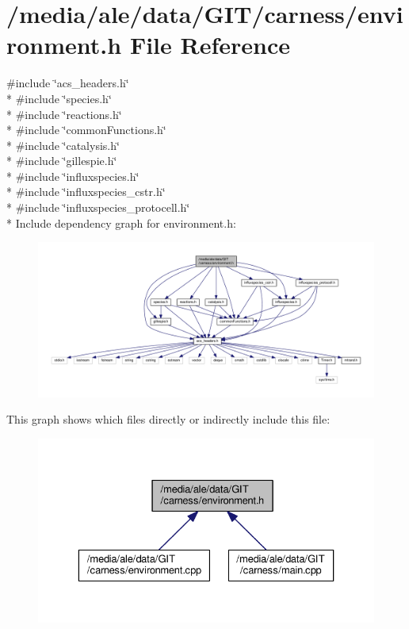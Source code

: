 \hypertarget{a00030}{\section{/media/ale/data/\-G\-I\-T/carness/environment.h File Reference}
\label{a00030}
}
{\ttfamily \#include \char`\"{}acs\-\_\-headers.\-h\char`\"{}}\\*
{\ttfamily \#include \char`\"{}species.\-h\char`\"{}}\\*
{\ttfamily \#include \char`\"{}reactions.\-h\char`\"{}}\\*
{\ttfamily \#include \char`\"{}common\-Functions.\-h\char`\"{}}\\*
{\ttfamily \#include \char`\"{}catalysis.\-h\char`\"{}}\\*
{\ttfamily \#include \char`\"{}gillespie.\-h\char`\"{}}\\*
{\ttfamily \#include \char`\"{}influxspecies.\-h\char`\"{}}\\*
{\ttfamily \#include \char`\"{}influxspecies\-\_\-cstr.\-h\char`\"{}}\\*
{\ttfamily \#include \char`\"{}influxspecies\-\_\-protocell.\-h\char`\"{}}\\*
Include dependency graph for environment.\-h\-:\nopagebreak
\begin{figure}[H]
\begin{center}
\leavevmode
\includegraphics[width=350pt]{a00059}
\end{center}
\end{figure}
This graph shows which files directly or indirectly include this file\-:\nopagebreak
\begin{figure}[H]
\begin{center}
\leavevmode
\includegraphics[width=329pt]{a00060}
\end{center}
\end{figure}
